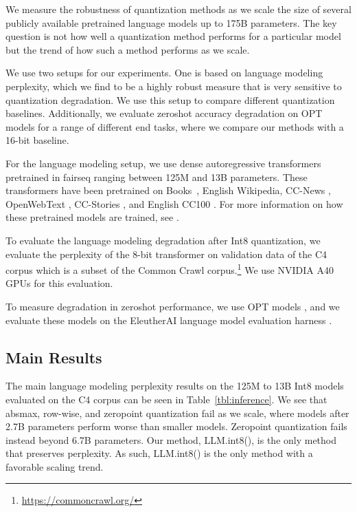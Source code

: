We measure the robustness of quantization methods as we scale the size of several publicly available pretrained language models up to 175B parameters. The key question is not how well a quantization method performs for a particular model but the trend of how such a method performs as we scale.

We use two setups for our experiments. One is based on language modeling perplexity, which we find to be a highly robust measure that is very sensitive to quantization degradation. We use this setup to compare different quantization baselines. Additionally, we evaluate zeroshot accuracy degradation on OPT models for a range of different end tasks, where we compare our methods with a 16-bit baseline.

For the language modeling setup, we use dense autoregressive transformers pretrained in fairseq \citep{ott2019fairseq} ranging between 125M and 13B parameters. These transformers have been pretrained on Books~\citep{zhu2015aligning}, English Wikipedia, CC-News \citep{nagel2016cc}, OpenWebText \citep{gokaslan2019openwebtext}, CC-Stories \citep{trinh2018simple}, and English CC100 \citep{wenzek-etal-2020-ccnet}. For more information on how these pretrained models are trained, see \citet{artetxe2021efficient}.

To evaluate the language modeling degradation after Int8 quantization, we evaluate the perplexity of the 8-bit transformer on validation data of the C4 corpus \citep{raffel2019exploring} which is a subset of the Common Crawl corpus.\footnote{\url{https://commoncrawl.org/}} We use NVIDIA A40 GPUs for this evaluation.

To measure degradation in zeroshot performance, we use OPT models \citep{zhang2022opt}, and we evaluate these models on the EleutherAI language model evaluation harness \citep{eval-harness}.

\subsection{Main Results}

The main language modeling perplexity results on the 125M to 13B Int8 models evaluated on the C4 corpus can be seen in Table~\ref{tbl:inference}. We see that absmax, row-wise, and zeropoint quantization fail as we scale, where models after 2.7B parameters perform worse than smaller models. Zeropoint quantization fails instead beyond 6.7B parameters. Our method, LLM.int8(), is the only method that preserves perplexity. As such, LLM.int8() is the only method with a favorable scaling trend.

